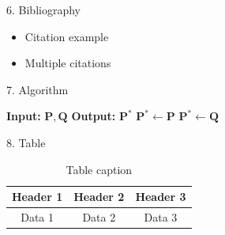 \documentclass[10pt]{beamer}
\begin{document}

\begin{frame}{6. Bibliography}
    \begin{itemize}
        \item Citation example\cite{example2023}
        \item Multiple citations\cite{example2023,example2024}
    \end{itemize}
    
    \begin{center}
        \large
    \end{center}
\end{frame}


\begin{frame}{7. Algorithm}
    \begin{algorithm}[H]
        \begin{algorithmic}[1]
            \State \textbf{Input:} $\bm{P}, \bm{Q}$
            \State \textbf{Output:} $\bm{P}^*$
            \State $\bm{P}^* \leftarrow \bm{P}$
            \State $\bm{P}^* \leftarrow \bm{Q}$
        \end{algorithmic}
        \caption{Algorithm caption}
        \label{alg:algorithm}
    \end{algorithm}
\end{frame}


\begin{frame}{8. Table}
    \begin{table}[H]
        \centering
        \begin{tabular}{ccc}
            \toprule
            Header 1 & Header 2 & Header 3 \\
            \midrule
            Data 1 & Data 2 & Data 3 \\
            \bottomrule
        \end{tabular}
        \caption{Table caption}
        \label{tab:table}
    \end{table}
\end{frame}
\end{document}
